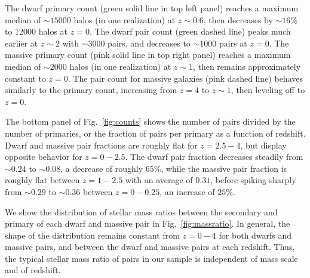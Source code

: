 \documentclass[twocolumn]{aastex631}
\begin{document}
        The dwarf primary count (green solid line in top left panel) reaches a maximum median of $\sim15000$ halos (in one realization) at $z\sim0.6$, then decreases by $\sim16\%$ to 12000 halos at $z=0$. 
        The dwarf pair count (green dashed line) peaks much earlier at $z\sim2$ with $\sim3000$ pairs, and decreases to $\sim1000$ pairs at $z=0$.
        The massive primary count (pink solid line in top right panel) reaches a maximum median of $\sim2000$ halos (in one realization) at $z\sim1$, then remains approximately constant to $z=0$. 
        The pair count for massive galaxies (pink dashed line) behaves similarly to the primary count, increasing from $z=4$ to $z\sim1$, then leveling off to $z=0$.

        The bottom panel of Fig.~\ref{fig:counts} shows the number of pairs divided by the number of primaries, or the fraction of pairs per primary as a function of redshift. 
        Dwarf and massive pair fractions are roughly flat for $z=2.5-4$, but display opposite behavior for $z=0-2.5$. The dwarf pair fraction decreases steadily from $\sim0.24$ to $\sim0.08$, a decrease of roughly $65\%$, while the massive pair fraction is roughly flat between $z=1-2.5$ with an average of $0.31$, before spiking sharply from $\sim 0.29$ to $\sim 0.36$ between $z=0-0.25$, an increase of $25\%$.

        We show the distribution of stellar mass ratios between the secondary and primary of each dwarf and massive pair in Fig.~\ref{fig:massratio}.
        In general, the shape of the distribution remains constant from $z=0-4$ for both dwarfs and massive pairs, and between the dwarf and massive pairs at each redshift. 
        Thus, the typical stellar mass ratio of pairs in our sample is independent of mass scale and of redshift.


            
\end{document}
